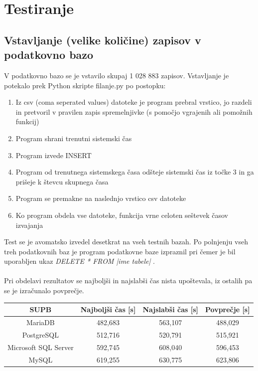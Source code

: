 \documentclass[a4paper,11pt]{report}
\begin{document}
\chapter{Testiranje}

\section{Vstavljanje (velike količine) zapisov v podatkovno bazo}

V podatkovno bazo se je vstavilo skupaj 1 028 883 zapisov. Vstavljanje je potekalo prek Python skripte filanje.py po postopku: 

\begin{enumerate}
   \item Iz csv (coma seperated values) datoteke je program prebral vrstico, jo razdeli in pretvoril v pravilen zapis spremelnjivke (s pomočjo vgrajenih ali pomožnih funkcij)
   \item Program shrani trenutni sistemski čas
   \item Program izvede INSERT
   \item Program od trenutnega sistemskega časa odšteje sistemski čas iz točke 3 in ga prišeje k števcu skupnega časa 
   \item Program se premakne na naslednjo vrstico csv datoteke
   \item Ko program obdela vse datoteke, funkcija vrne celoten seštevek časov izvajanja
\end{enumerate}
Test se je avomatsko izvedel desetkrat na vseh testnih bazah.
Po polnjenju vseh treh podatkovnih baz je program podatkovne baze izpraznil pri čemer je bil uporabljen ukaz \textit{DELETE * FROM |ime tabele| }. 
\\\\
Pri obdelavi rezultatov se najboljši in najslabši čas nista upoštevala, iz ostalih pa se je izračunalo povprečje.

\begin{center}
   \begin{tabular}{||c|c|c|c||}
      \hline
      \textbf{SUPB} & \textbf{Najboljši čas [s]} & \textbf{Najslabši čas [s]} & \textbf{Povprečje [s]} \\
      \hline
      \hline
      MariaDB & 482,683 & 563,107 & 488,029 \\
      PostgreSQL & 512,716 & 520,791 & 515,921 \\
      Microsoft SQL Server & 592,745 & 608,040 & 596,453 \\
      MySQL & 619,255 & 630,775 & 623,806\\
      \hline
   \end{tabular}
\end{center}
\end{document}
